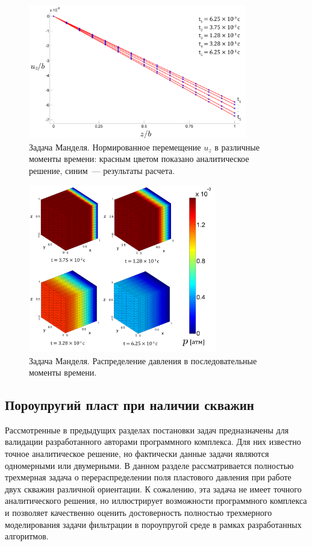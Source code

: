 \begin{figure}[t!]
\centering
\includegraphics[width=0.85\textwidth]{./figs/uuz0M.png}
\caption{ Задача Манделя. Нормированное перемещение $u_z$ в различные моменты времени: красным цветом показано
аналитическое решение, синим~--- результаты расчета.}\label{fig:manuz}
\end{figure}
%

%
\begin{figure}[h!]
\centering
\includegraphics[width=0.73\textwidth]{./figs/prM.png}
\caption{ Задача Манделя. Распределение давления в последовательные моменты времени.}\label{fig:manpp}
\end{figure}
%

\subsection{Пороупругий пласт при наличии скважин}

Рассмотренные в предыдущих разделах постановки задач предназначены для валидации
разработанного авторами программного комплекса. Для них известно точное аналитическое решение,
но фактически данные задачи являются одномерными или двумерными.
В данном разделе рассматривается полностью трехмерная задача о перераспределении поля пластового давления
при работе двух скважин различной ориентации. К сожалению, эта задача не имеет точного аналитического решения, но иллюстрирует
возможности программного комплекса и позволяет качественно оценить достоверность полностью трехмерного моделирования задачи фильтрации в пороупругой среде в рамках разработанных алгоритмов.

